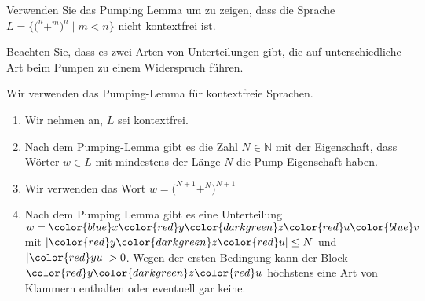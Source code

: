 Verwenden Sie das Pumping Lemma um zu zeigen, dass die Sprache
\(
L
=
\{
\texttt{(}^n
\texttt{+}^m
\texttt{)}^n
\mid
m < n
\}
\)
nicht kontextfrei ist.

\begin{hinweis}
Beachten Sie, dass es zwei Arten von Unterteilungen gibt, die auf
unterschiedliche Art beim Pumpen zu einem Widerspruch führen.
\end{hinweis}

\begin{loesung}
\def\h{0.6}
\def\o{0.04}
\def\punkt#1#2{({(#1)*\h},{(#2)*\h})}
\def\kasten#1#2#3#4{
	\ifnum0=#1
	\def\s{\o}
	\else
	\def\s{0}
	\fi
	\ifnum 22=#2
	\def\t{\o}
	\else
	\def\t{0}
	\fi
	\fill[color=#3!20,opacity=0.5]
		\punkt{#1+\o+\s}{2*\o} rectangle \punkt{#2-\o-\t}{1-2*\o};
	\draw[color=#3]
		\punkt{#1+\o+\s}{2*\o} rectangle \punkt{#2-\o-\t}{1-2*\o};
	\node[color=#3] at \punkt{0.5*(#1+#2)}{0.5} {$#4\mathstrut$};
}
Wir verwenden das Pumping-Lemma für kontextfreie Sprachen.
\begin{enumerate}
\item
Wir nehmen an, $L$ sei kontextfrei.
\item
Nach dem Pumping-Lemma gibt es die Zahl $N\in\mathbb{N}$ mit der Eigenschaft,
dass Wörter $w\in L$ mit mindestens der Länge $N$ die Pump-Eigenschaft haben.
\item
Wir verwenden das Wort 
$
w
=
\texttt{(}^{N+1}
\texttt{+}^N
\texttt{)}^{N+1}
$
\begin{center}
\end{center}
\item
Nach dem Pumping Lemma gibt es eine Unterteilung
$w
=
{\color{blue}x}
{\color{red}y}
{\color{darkgreen}z}
{\color{red}u}
{\color{blue}v}
$
mit
$
|
{\color{red}y}
{\color{darkgreen}z}
{\color{red}u}
| \le N
$
und
$
|{\color{red}yu}|>0
$.
Wegen der ersten Bedingung kann der Block 
$
{\color{red}y}
{\color{darkgreen}z}
{\color{red}u}
$
höchstens eine Art von Klammern enthalten oder eventuell gar keine.

\end{enumerate}
\end{loesung}
